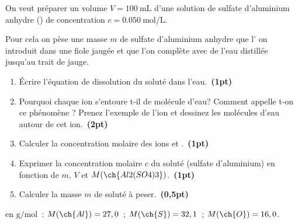 On veut préparer un volume $V=\qty{100}{\mL}$ d'une solution de sulfate
d'aluminium anhydre () de concentration $c=\qty{0.050}{\mol\per\L}$.

Pour cela on pèse une masse $m$ de sulfate d'aluminium anhydre
que l' on introduit dans une fiole jaugée et que l'on complète avec de l'eau
distillée jusqu'au trait de jauge.
\begin{enumerate}
    \item Écrire l'équation de dissolution du soluté dans l'eau.~\textbf{(1pt)}
    \item Pourquoi chaque ion s'entoure t-il de molécule d'eau? Comment appelle
          t-on ce phénomène ? Prenez l'exemple de l'ion  et
          dessinez les molécules d'eau autour de cet ion.~\textbf{(2pt)}
    \item Calculer la concentration molaire des ions  et
          .~\textbf{(1pt)}
    \item Exprimer la concentration molaire $c$ du soluté (sulfate d'aluminium)
          en fonction de $m$, $V$ et $M(\ch{Al2(SO4)3})$.~\textbf{(1pt)}
    \item Calculer la masse $m$ de soluté à peser.~\textbf{(0,5pt)}
\end{enumerate}

\begin{donnees}
    en $\unit{\g\per\mol}$~: $M(\ch{Al})=27,0$~; $M(\ch{S})=32,1$~;
    $M(\ch{O})=16,0$.
\end{donnees}
